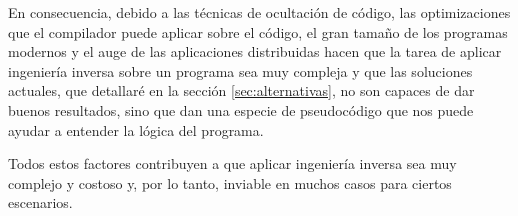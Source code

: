En consecuencia, debido a las técnicas de ocultación de código, las optimizaciones que el compilador puede aplicar sobre el código, el gran tamaño de los programas modernos y el auge
de las aplicaciones distribuidas hacen que la tarea de aplicar ingeniería inversa sobre un programa sea muy compleja y que las soluciones actuales, que detallaré en la sección
\ref{sec:alternativas}, no son capaces de dar buenos resultados, sino que dan una especie de pseudocódigo que nos puede ayudar a entender la lógica del programa.

Todos estos factores contribuyen a que aplicar ingeniería inversa sea muy complejo y costoso y, por lo tanto, inviable en muchos casos para ciertos escenarios.